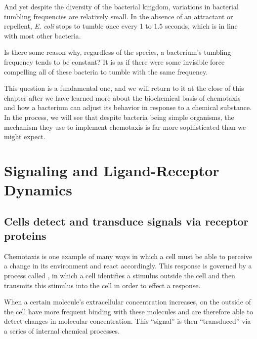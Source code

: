 And yet despite the diversity of the bacterial kingdom, variations in bacterial tumbling frequencies are relatively small. In the absence of an attractant or repellent, \textit{E. coli} stops to tumble once every 1 to 1.5 seconds, which is in line with most other bacteria.

Is there some reason why, regardless of the species, a bacterium's tumbling frequency tends to be constant? It is as if there were some invisible force compelling all of these bacteria to tumble with the same frequency.

This question is a fundamental one, and we will return to it at the close of this chapter after we have learned more about the biochemical basis of chemotaxis and how a bacterium can adjust its behavior in response to a chemical substance. In the process, we will see that despite bacteria being simple organisms, the mechanism they use to implement chemotaxis is far more sophisticated than we might expect.\\

\begin{qbox}\end{qbox}


\FloatBarrier
{}
\section{Signaling and Ligand-Receptor Dynamics}
\label{sec:signal}

\subsection{Cells detect and transduce signals via receptor proteins}

Chemotaxis is one example of many ways in which a cell must be able to perceive a change in its environment and react accordingly. This response is governed by a process called , in which a cell identifies a stimulus outside the cell and then transmits this stimulus into the cell in order to effect a response.

When a certain molecule's extracellular concentration increases,  on the outside of the cell have more frequent binding with these molecules and are therefore able to detect changes in molecular concentration. This ``signal'' is then ``transduced'' via a series of internal chemical processes.

